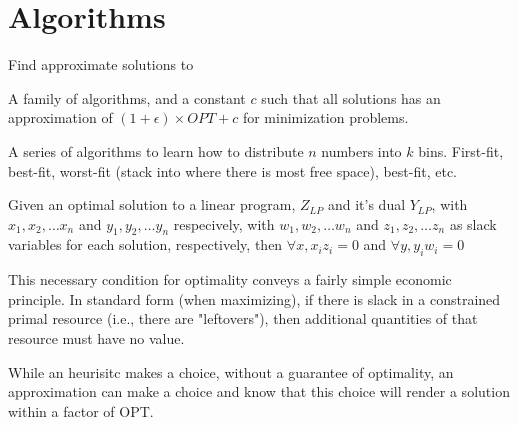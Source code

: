 \section{Algorithms}\label{section:word}

\begin{definition}
    Find approximate solutions to~
\end{definition}

    

\begin{definition}
\label{APTAS}
    A family of algorithms, and a constant $c$ such that all solutions has an
    approximation of $(1 + \epsilon)\times{OPT} + c$ for minimization problems.
\end{definition}


\begin{definition}
    A series of algorithms to learn how to distribute $n$ numbers into $k$ bins.
    First-fit, best-fit, worst-fit (stack into where there is most free space),
    best-fit, etc.
\end{definition}

\begin{definition}
    Given an optimal solution to a linear program,
    $Z_{LP}$ and it's dual $Y_{LP}$, with $x_{1}, x_{2}, \dots x_{n}$ and
    $y_{1}, y_{2}, \dots y_{n}$ respecively, with
    $w_{1}, w_{2}, \dots w_{n}$ and $z_{1}, z_{2}, \dots z_{n}$  as slack
    variables for each solution, respectively,
    then $\forall x, x_{i}z_{i} = 0$ and $\forall y, y_{i} w_{i} = 0$

    This necessary condition for optimality conveys a fairly simple economic
    principle.  In standard form (when maximizing), if there is slack in a
    constrained primal resource (i.e., there are "leftovers"),
    then additional quantities of that resource must have no value. 
\end{definition}

\begin{definition}
    While an heurisitc makes a choice, without a guarantee of optimality,
    an approximation can make a choice and know that this choice will render
    a solution within a factor of OPT.
\end{definition}

